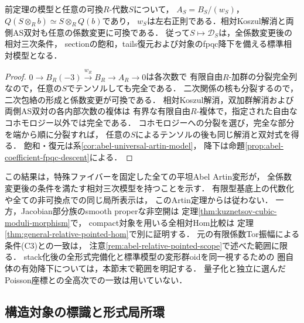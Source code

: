 \begin{corollary}[相対三次条件の普遍性]
\label{cor:abel-universal-relative-cubic}
前定理の模型と任意の可換$R$-代数$S$について，
$A_S=B_S/(w_S)$，$Q(S\otimes_R b)\simeq S\otimes_R Q(b)$であり，
$w_S$は左右正則である．相対Koszul解消と両側AS双対も任意の係数変更に可換である．
従って$S\mapsto\mathcal D_S$は，全係数変更後の相対三次条件，
sectionの飽和，tails復元および対象のfpqc降下を備える標準相対模型となる．
\end{corollary}
\begin{proof}
$0\to B_R(-3)\xrightarrow{w_R}B_R\to A_R\to0$は各次数で
有限自由$R$-加群の分裂完全列なので，任意の$S$でテンソルしても完全である．
二次関係の核も分裂するので，二次包絡の形成と係数変更が可換である．
相対Koszul解消，双加群解消および両側AS双対の各内部次数の複体は
有界な有限自由$R$-複体で，指定された自由なコホモロジー以外では完全である．
コホモロジーへの分裂を選び，完全な部分を端から順に分裂すれば，
任意の$S$によるテンソルの後も同じ解消と双対式を得る．
飽和・復元は系\ref{cor:abel-universal-artin-model}，
降下は命題\ref{prop:abel-coefficient-fpqc-descent}による．
\end{proof}

\begin{remark}[局所完全性と大域の問題]
この結果は，特殊ファイバーを固定した全ての平坦Abel Artin変形が，
全係数変更後の条件を満たす相対三次模型を持つことを示す．
有限型基底上の代数化や全ての非可換点での同じ局所表示は，
このArtin定理からは従わない．
一方，Jacobian部分族のsmooth properな非空開は
定理\ref{thm:kuznetsov-cubic-moduli-morphism}で，
compact対象を用いる全相対Hom比較は
定理\ref{thm:general-relative-pointed-hom}で別に証明する．
元の有限係数Tor振幅による条件\textup{(C3)}との一致は，
注意\ref{rem:abel-relative-pointed-scope}で述べた範囲に限る．
stack化後の全形式完備化と標準模型の変形群oidを同一視するための
圏自体の有効降下については，本節末で範囲を明記する．
量子化と独立に選んだPoisson座標との全高次での一致は用いていない．
\end{remark}

\subsection{構造対象の標識と形式局所環}

